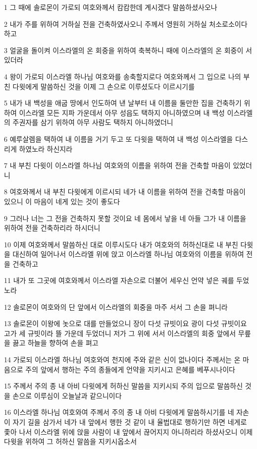 \par 1 그 때에 솔로몬이 가로되 여호와께서 캄캄한데 계시겠다 말씀하셨사오나
\par 2 내가 주를 위하여 거하실 전을 건축하였사오니 주께서 영원히 거하실 처소로소이다 하고
\par 3 얼굴을 돌이켜 이스라엘의 온 회중을 위하여 축복하니 때에 이스라엘의 온 회중이 서 있더라
\par 4 왕이 가로되 이스라엘 하나님 여호와를 송축할지로다 여호와께서 그 입으로 나의 부친 다윗에게 말씀하신 것을 이제 그 손으로 이루셨도다 이르시기를
\par 5 내가 내 백성을 애굽 땅에서 인도하여 낸 날부터 내 이름을 둘만한 집을 건축하기 위하여 이스라엘 모든 지파 가운데서 아무 성읍도 택하지 아니하였으며 내 백성 이스라엘의 주권자를 삼기 위하여 아무 사람도 택하지 아니하였더니
\par 6 예루살렘을 택하여 내 이름을 거기 두고 또 다윗을 택하여 내 백성 이스라엘을 다스리게 하였노라 하신지라
\par 7 내 부친 다윗이 이스라엘 하나님 여호와의 이름을 위하여 전을 건축할 마음이 있었더니
\par 8 여호와께서 내 부친 다윗에게 이르시되 네가 내 이름을 위하여 전을 건축할 마음이 있으니 이 마음이 네게 있는 것이 좋도다
\par 9 그러나 너는 그 전을 건축하지 못할 것이요 네 몸에서 낳을 네 아들 그가 내 이름을 위하여 전을 건축하리라 하시더니
\par 10 이제 여호와께서 말씀하신 대로 이루시도다 내가 여호와의 허하신대로 내 부친 다윗을 대신하여 일어나서 이스라엘 위에 앉고 이스라엘 하나님 여호와의 이름을 위하여 전을 건축하고
\par 11 내가 또 그곳에 여호와께서 이스라엘 자손으로 더불어 세우신 언약 넣은 궤를 두었노라
\par 12 솔로몬이 여호와의 단 앞에서 이스라엘의 회중을 마주 서서 그 손을 펴니라
\par 13 솔로몬이 이왕에 놋으로 대를 만들었으니 장이 다섯 규빗이요 광이 다섯 규빗이요 고가 세 규빗이라 뜰 가운데 두었더니 저가 그 위에 서서 이스라엘의 회중 앞에서 무릎을 끓고 하늘을 향하여 손을 펴고
\par 14 가로되 이스라엘 하나님 여호와여 천지에 주와 같은 신이 없나이다 주께서는 온 마음으로 주의 앞에서 행하는 주의 종들에게 언약을 지키시고 은혜를 베푸시나이다
\par 15 주께서 주의 종 내 아비 다윗에게 허하신 말씀을 지키시되 주의 입으로 말씀하신 것을 손으로 이루심이 오늘날과 같으니이다
\par 16 이스라엘 하나님 여호와여 주께서 주의 종 내 아비 다윗에게 말씀하시기를 네 자손이 자기 길을 삼가서 네가 내 앞에서 행한 것 같이 내 율법대로 행하기만 하면 네게로 좇아 나서 이스라엘 위에 앉을 사람이 내 앞에서 끊어지지 아니하리라 하셨사오니 이제 다윗을 위하여 그 허하신 말씀을 지키시옵소서
